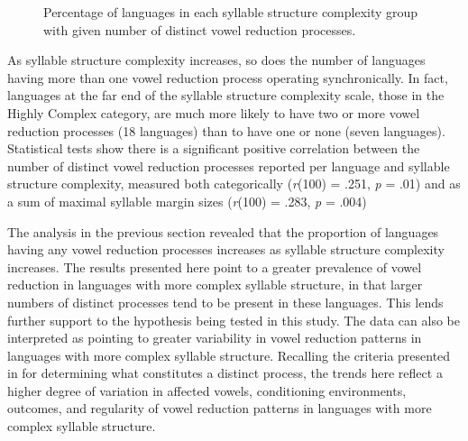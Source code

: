   
\begin{figure}
\caption{\label{fig:6.1}Percentage of languages in each syllable structure complexity group with given number of distinct vowel reduction processes.}
\end{figure}

  As syllable structure complexity increases, so does the number of languages having more than one vowel reduction process operating synchronically. In fact, languages at the far end of the syllable structure complexity scale, those in the Highly Complex category, are much more likely to have two or more vowel reduction processes (18 languages) than to have one or none (seven languages). Statistical tests show there is a significant positive correlation between the number of distinct vowel reduction processes reported per language and syllable structure complexity, measured both categorically (\textit{r}(100) = .251, \textit{p} = .01) and as a sum of maximal syllable margin sizes (\textit{r}(100) = .283, \textit{p} = .004)

  The analysis in the previous section revealed that the proportion of languages having any vowel reduction processes increases as syllable structure complexity increases. The results presented here point to a greater prevalence of vowel reduction in languages with more complex syllable structure, in that larger numbers of distinct processes tend to be present in these languages. This lends further support to the hypothesis being tested in this study. The data can also be interpreted as pointing to greater variability in vowel reduction patterns in languages with more complex syllable structure. Recalling the criteria presented in  for determining what constitutes a distinct process, the trends here reflect a higher degree of variation in affected vowels, conditioning environments, outcomes, and regularity of vowel reduction patterns in languages with more complex syllable structure.

